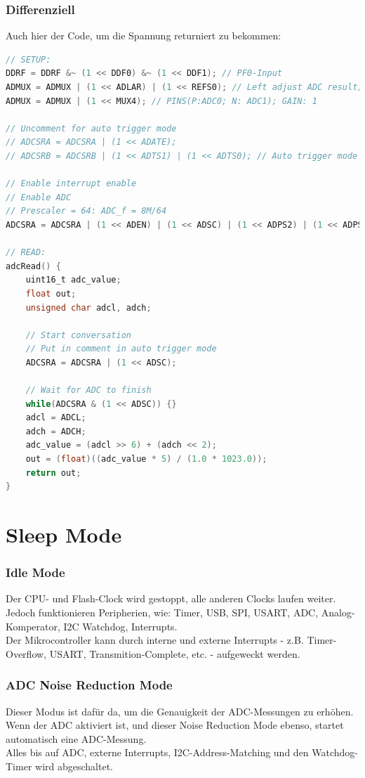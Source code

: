 \subsubsection*{Differenziell}
Auch hier der Code, um die Spannung returniert zu bekommen:
\begin{lstlisting}[language=C]
// SETUP:
DDRF = DDRF &~ (1 << DDF0) &~ (1 << DDF1); // PF0-Input
ADMUX = ADMUX | (1 << ADLAR) | (1 << REFS0); // Left adjust ADC result; Voltage reference
ADMUX = ADMUX | (1 << MUX4); // PINS(P:ADC0; N: ADC1); GAIN: 1

// Uncomment for auto trigger mode
// ADCSRA = ADCSRA | (1 << ADATE);	
// ADCSRB = ADCSRB | (1 << ADTS1) | (1 << ADTS0); // Auto trigger mode Taktquelle (Timer0)

// Enable interrupt enable
// Enable ADC
// Prescaler = 64: ADC_f = 8M/64
ADCSRA = ADCSRA | (1 << ADEN) | (1 << ADSC) | (1 << ADPS2) | (1 << ADPS1);
    
// READ:
adcRead() {
    uint16_t adc_value;
    float out;
    unsigned char adcl, adch;
    
    // Start conversation
    // Put in comment in auto trigger mode
    ADCSRA = ADCSRA | (1 << ADSC);

    // Wait for ADC to finish
    while(ADCSRA & (1 << ADSC)) {}
    adcl = ADCL;
    adch = ADCH;
    adc_value = (adcl >> 6) + (adch << 2);
    out = (float)((adc_value * 5) / (1.0 * 1023.0));
    return out;
}
\end{lstlisting}

\section{Sleep Mode}
\subsubsection*{Idle Mode}
Der CPU- und Flash-Clock wird gestoppt, alle anderen Clocks laufen weiter. Jedoch funktionieren Peripherien, wie: Timer, USB, SPI, USART, ADC, Analog-Komperator, I2C Watchdog, Interrupts. \\
Der Mikrocontroller kann durch interne und externe Interrupts - z.B. Timer-Overflow, USART, Transmition-Complete, etc. - aufgeweckt werden.

\subsubsection*{ADC Noise Reduction Mode}
Dieser Modus ist dafür da, um die Genauigkeit der ADC-Messungen zu erhöhen. Wenn der ADC aktiviert ist, und dieser Noise Reduction Mode ebenso, startet automatisch eine ADC-Messung. \\
Alles bis auf ADC, externe Interrupts, I2C-Address-Matching und den Watchdog-Timer wird abgeschaltet. \\

